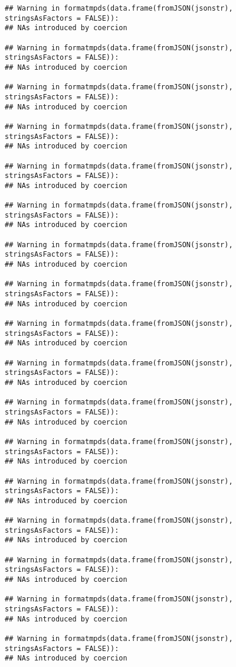 \documentclass[
]{article}
\begin{document}
\begin{verbatim}
## Warning in formatmpds(data.frame(fromJSON(jsonstr), stringsAsFactors = FALSE)):
## NAs introduced by coercion

## Warning in formatmpds(data.frame(fromJSON(jsonstr), stringsAsFactors = FALSE)):
## NAs introduced by coercion

## Warning in formatmpds(data.frame(fromJSON(jsonstr), stringsAsFactors = FALSE)):
## NAs introduced by coercion

## Warning in formatmpds(data.frame(fromJSON(jsonstr), stringsAsFactors = FALSE)):
## NAs introduced by coercion

## Warning in formatmpds(data.frame(fromJSON(jsonstr), stringsAsFactors = FALSE)):
## NAs introduced by coercion

## Warning in formatmpds(data.frame(fromJSON(jsonstr), stringsAsFactors = FALSE)):
## NAs introduced by coercion

## Warning in formatmpds(data.frame(fromJSON(jsonstr), stringsAsFactors = FALSE)):
## NAs introduced by coercion

## Warning in formatmpds(data.frame(fromJSON(jsonstr), stringsAsFactors = FALSE)):
## NAs introduced by coercion

## Warning in formatmpds(data.frame(fromJSON(jsonstr), stringsAsFactors = FALSE)):
## NAs introduced by coercion

## Warning in formatmpds(data.frame(fromJSON(jsonstr), stringsAsFactors = FALSE)):
## NAs introduced by coercion

## Warning in formatmpds(data.frame(fromJSON(jsonstr), stringsAsFactors = FALSE)):
## NAs introduced by coercion

## Warning in formatmpds(data.frame(fromJSON(jsonstr), stringsAsFactors = FALSE)):
## NAs introduced by coercion

## Warning in formatmpds(data.frame(fromJSON(jsonstr), stringsAsFactors = FALSE)):
## NAs introduced by coercion

## Warning in formatmpds(data.frame(fromJSON(jsonstr), stringsAsFactors = FALSE)):
## NAs introduced by coercion

## Warning in formatmpds(data.frame(fromJSON(jsonstr), stringsAsFactors = FALSE)):
## NAs introduced by coercion

## Warning in formatmpds(data.frame(fromJSON(jsonstr), stringsAsFactors = FALSE)):
## NAs introduced by coercion

## Warning in formatmpds(data.frame(fromJSON(jsonstr), stringsAsFactors = FALSE)):
## NAs introduced by coercion


\end{verbatim}
\end{document}
